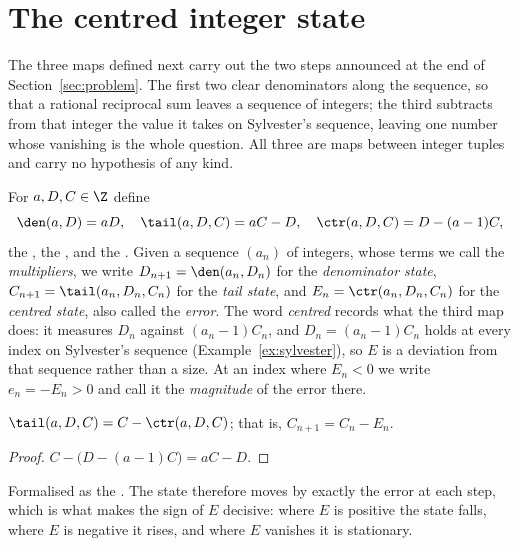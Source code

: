 \section{The centred integer state}\label{sec:state}

The three maps defined next carry out the two steps announced at the end of
Section~\ref{sec:problem}.  The first two clear denominators along the
sequence, so that a rational reciprocal sum leaves a sequence of integers; the
third subtracts from that integer the value it takes on Sylvester's sequence,
leaving one number whose vanishing is the whole question.  All three are maps
between integer tuples and carry no hypothesis of any kind.

For $a,D,C\in\Z$ define
\[
 \den(a,D)=aD,
 \quad
 \tail(a,D,C)=aC-D,
 \quad
 \ctr(a,D,C)=D-(a-1)C ,
\]
the
, the
,
and the
.
Given a sequence $(a_n)$ of integers, whose terms we call the
\emph{multipliers}, we write $D_{n+1}=\den(a_n,D_n)$ for the \emph{denominator
state}, $C_{n+1}=\tail(a_n,D_n,C_n)$ for the \emph{tail state}, and
$E_n=\ctr(a_n,D_n,C_n)$ for the \emph{centred state}, also called the
\emph{error}.  The word \emph{centred} records what the third map does: it
measures $D_n$ against $(a_n-1)C_n$, and $D_n=(a_n-1)C_n$ holds at every index
on Sylvester's sequence (Example~\ref{ex:sylvester}), so $E$ is a deviation
from that sequence rather than a size.  At an index where $E_n<0$ we write
$e_n=-E_n>0$ and call it the \emph{magnitude} of the error there.

\begin{proposition}\label{res:update}
$\tail(a,D,C)=C-\ctr(a,D,C)$; that is, $C_{n+1}=C_n-E_n$.
\end{proposition}

\begin{proof}
$C-\bigl(D-(a-1)C\bigr)=aC-D$.
\end{proof}

\noindent Formalised as the
.  The state therefore moves by exactly the error at each step, which is
what makes the sign of $E$ decisive: where $E$ is positive the state falls,
where $E$ is negative it rises, and where $E$ vanishes it is stationary.

